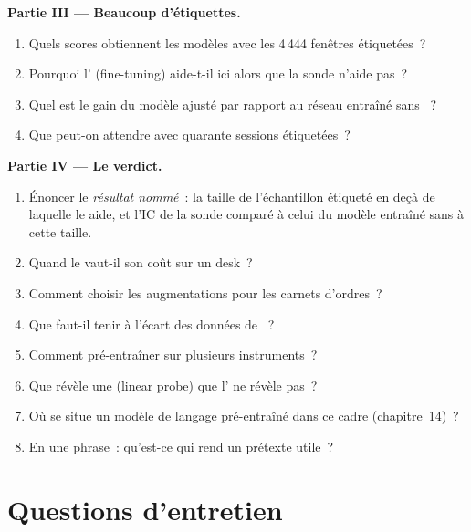 \begin{problem}
\medskip\noindent\textbf{Partie III --- Beaucoup d'étiquettes.}
\begin{enumerate}[resume]
\item Quels scores obtiennent les modèles avec les 4\,444 fenêtres étiquetées~?
\item Pourquoi l' (fine-tuning) aide-t-il ici alors que la sonde n'aide pas~?
\item Quel est le gain du modèle ajusté par rapport au réseau entraîné sans ~?
\item Que peut-on attendre avec quarante sessions étiquetées~?
\end{enumerate}

\medskip\noindent\textbf{Partie IV --- Le verdict.}
\begin{enumerate}[resume]
\item Énoncer le \emph{résultat nommé}~: la taille de l'échantillon étiqueté en deçà de laquelle le  aide, et l'IC de la sonde comparé à celui
du modèle entraîné sans  à cette taille.
\item Quand le  vaut-il son coût sur un desk~?
\item Comment choisir les augmentations pour les carnets d'ordres~?
\item Que faut-il tenir à l'écart des données de ~?
\item Comment pré-entraîner sur plusieurs instruments~?
\item Que révèle une  (linear probe) que l' ne révèle pas~?
\item Où se situe un modèle de langage pré-entraîné dans ce cadre (chapitre~14)~?
\item En une phrase~: qu'est-ce qui rend un prétexte utile~?
\end{enumerate}
\end{problem}

\section{Questions d'entretien}

